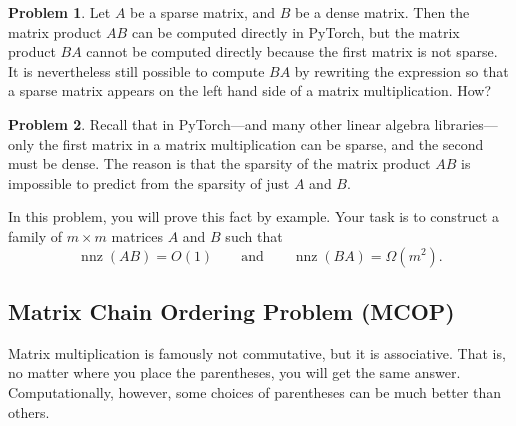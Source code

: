 \documentclass[10pt]{article}
\theoremstyle{definition}
\newtheorem{problem}{Problem}
\newtheorem{note}{Note}
\DeclareMathOperator{\nnz}{nnz}
\newcommand{\trans}[1]{{#1}^{T}}
\begin{document}
\newpage
\begin{problem}
    Let $A$ be a sparse matrix, and $B$ be a dense matrix.
        Then the matrix product $AB$ can be computed directly in PyTorch,
        but the matrix product $BA$ cannot be computed directly because the first matrix is not sparse.
        It is nevertheless still possible to compute $BA$ by rewriting the expression so that a sparse matrix appears on the left hand side of a matrix multiplication.
        How?
\end{problem}
\vspace{4in}

\begin{problem}
    Recall that in PyTorch---and many other linear algebra libraries---only the first matrix in a matrix multiplication can be sparse,
    and the second must be dense.
    The reason is that the sparsity of the matrix product $AB$ is impossible to predict from the sparsity of just $A$ and $B$.

    In this problem, you will prove this fact by example.
    Your task is to construct a family of $m\times m$ matrices $A$ and $B$ such that
    \begin{equation}
        \nnz(AB) = O(1)
        \qquad
        \text{and}
        \qquad
        \nnz(BA) = \Omega(m^2)
        .
    \end{equation}
    \vspace{3in}
\end{problem}




\newpage
\subsection{Matrix Chain Ordering Problem (MCOP)}

Matrix multiplication is famously not commutative, but it is associative.
That is, no matter where you place the parentheses,
you will get the same answer.
Computationally, however, some choices of parentheses can be much better than others.
\end{document}
